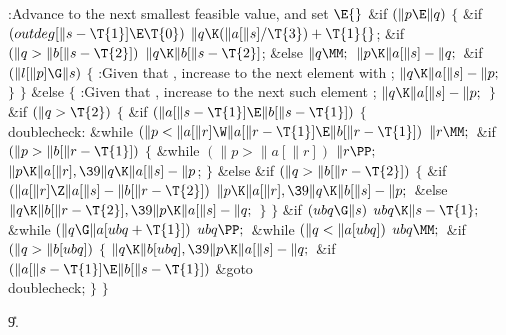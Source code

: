 \B{}:Advance  to the next smallest feasible value, and set %
\X${}\E{}$\6
\&{if} ${}(\|p\E\|q){}$\5
${}\{{}$\1\6
\&{if} ${}(\\{outdeg}[\|s-\T{1}]\E\T{0}){}$\1\5
${}\|q\K(\|a[\|s]/\T{3})+\T{1}{}$;\2\6
\&{if} ${}(\|q>\|b[\|s-\T{2}]){}$\1\5
${}\|q\K\|b[\|s-\T{2}]{}$;\5
\2\&{else}\1\5
${}\|q\MM;{}$\2\6
${}\|p\K\|a[\|s]-\|q;{}$\6
\&{if} ${}(\|l[\|p]\G\|s){}$\5
${}\{{}$\1\6
:Given that , increase  to the next element with
\X;\6
${}\|q\K\|a[\|s]-\|p;{}$\6
\4${}\}{}$\2\6
\4${}\}{}$\5
\2\&{else}\5
${}\{{}$\1\6
:Given that , increase  to the next such element%
\X;\6
${}\|q\K\|a[\|s]-\|p;{}$\6
\4${}\}{}$\2\6
\&{if} ${}(\|q>\T{2}){}$\5
${}\{{}$\1\6
\&{if} ${}(\|a[\|s-\T{1}]\E\|b[\|s-\T{1}]){}$\5
${}\{{}$\1\6
\4\\{doublecheck}:\5
\&{while} ${}(\|p<\|a[\|r]\W\|a[\|r-\T{1}]\E\|b[\|r-\T{1}]){}$\1\5
${}\|r\MM;{}$\2\6
\&{if} ${}(\|p>\|b[\|r-\T{1}]){}$\5
${}\{{}$\1\6
\&{while} ${}(\|p>\|a[\|r]){}$\1\5
${}\|r\PP;{}$\2\6
${}\|p\K\|a[\|r],\39\|q\K\|a[\|s]-\|p{}$;\6
\4${}\}{}$\5
\2\&{else} \&{if} ${}(\|q>\|b[\|r-\T{2}]){}$\5
${}\{{}$\1\6
\&{if} ${}(\|a[\|r]\Z\|a[\|s]-\|b[\|r-\T{2}]){}$\1\5
${}\|p\K\|a[\|r],\39\|q\K\|b[\|s]-\|p;{}$\2\6
\&{else}\1\5
${}\|q\K\|b[\|r-\T{2}],\39\|p\K\|a[\|s]-\|q;{}$\2\6
\4${}\}{}$\2\6
\4${}\}{}$\2\6
\&{if} ${}(\\{ubq}\G\|s){}$\1\5
${}\\{ubq}\K\|s-\T{1};{}$\2\6
\&{while} ${}(\|q\G\|a[\\{ubq}+\T{1}]){}$\1\5
${}\\{ubq}\PP;{}$\2\6
\&{while} ${}(\|q<\|a[\\{ubq}]){}$\1\5
${}\\{ubq}\MM;{}$\2\6
\&{if} ${}(\|q>\|b[\\{ubq}]){}$\5
${}\{{}$\1\6
${}\|q\K\|b[\\{ubq}],\39\|p\K\|a[\|s]-\|q;{}$\6
\&{if} ${}(\|a[\|s-\T{1}]\E\|b[\|s-\T{1}]){}$\1\5
\&{goto} \\{doublecheck};\2\6
\4${}\}{}$\2\6
\4${}\}{}$\2\par
\U9.\fi

